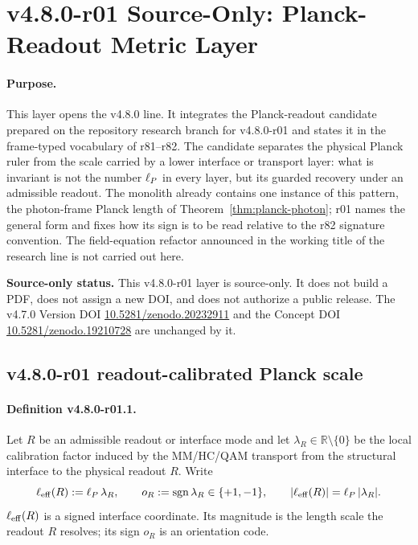 \clearpage
\section*{v4.8.0-r01 Source-Only: Planck-Readout Metric Layer}
\label{sec:v480-r01-planck-readout-metric-layer}

\paragraph{Purpose.}
This layer opens the v4.8.0 line.  It integrates the Planck-readout candidate prepared on the
repository research branch for v4.8.0-r01 and states it in the frame-typed vocabulary of
r81--r82.  The candidate separates the physical Planck ruler from the scale carried by a
lower interface or transport layer: what is invariant is not the number \(\ell_P\) in every
layer, but its guarded recovery under an admissible readout.  The monolith already contains
one instance of this pattern, the photon-frame Planck length of
Theorem~\ref{thm:planck-photon}; r01 names the general form and fixes how its sign is to be
read relative to the r82 signature convention.  The field-equation refactor announced in the
working title of the research line is not carried out here.

\noindent\textbf{Source-only status.}
This v4.8.0-r01 layer is source-only.  It does not build a PDF, does not assign a new DOI,
and does not authorize a public release.  The v4.7.0 Version DOI
\href{https://doi.org/10.5281/zenodo.20232911}{10.5281/zenodo.20232911} and the Concept DOI
\href{https://doi.org/10.5281/zenodo.19210728}{10.5281/zenodo.19210728} are unchanged by it.

\subsection*{v4.8.0-r01 readout-calibrated Planck scale}
\label{subsec:v480-r01-calibrated-scale}

\paragraph{Definition v4.8.0-r01.1.}
Let \(R\) be an admissible readout or interface mode and let \(\lambda_R\in\mathbb R\setminus\{0\}\)
be the local calibration factor induced by the MM/HC/QAM transport from the structural
interface to the physical readout \(R\).  Write
\[
\ell_{\rm eff}(R):=\ell_P\,\lambda_R,
\qquad
o_R:=\operatorname{sgn}\lambda_R\in\{+1,-1\},
\qquad
|\ell_{\rm eff}(R)|=\ell_P\,|\lambda_R| .
\]
\(\ell_{\rm eff}(R)\) is a signed interface coordinate.  Its magnitude is the length scale the
readout \(R\) resolves; its sign \(o_R\) is an orientation code.

